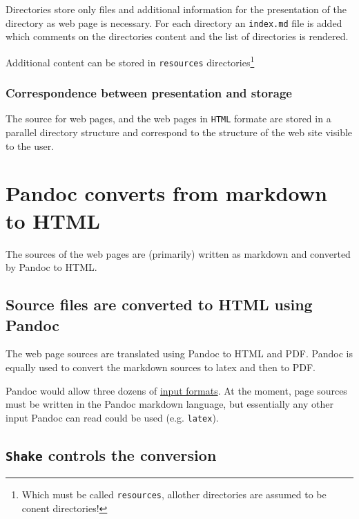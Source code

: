 \documentclass{tufte-book}
\begin{document}
Directories store only files and additional information for the
presentation of the directory as web page is necessary. For each
directory an \texttt{index.md} file is added which comments on the
directories content and the list of directories is rendered.

Additional content can be stored in \texttt{resources}
directories\footnote{Which must be called \texttt{resources}, allother
	directories are assumed to be conent directories!}

\hypertarget{correspondence-between-presentation-and-storage}{%
	\subsection{Correspondence between presentation and
		storage}\label{correspondence-between-presentation-and-storage}}

The source for web pages, and the web pages in \texttt{HTML} formate are
stored in a parallel directory structure and correspond to the structure
of the web site visible to the user.

\chapter{Pandoc converts from markdown to HTML}
\begin{mdframed}The sources of the web pages are (primarily) written as markdown and converted by Pandoc to HTML.\end{mdframed}
\hypertarget{source-files-are-converted-to-html-using-pandoc}{%
	\section{Source files are converted to HTML using
		Pandoc}\label{source-files-are-converted-to-html-using-pandoc}}

The web page sources are translated using Pandoc to HTML and PDF. Pandoc
is equally used to convert the markdown sources to latex and then to
PDF.

Pandoc would allow three dozens of
\href{https://pandoc.org/MANUAL.html}{input formats}. At the moment,
page sources must be written in the Pandoc markdown language, but
essentially any other input Pandoc can read could be used (e.g.
\texttt{latex}).

\hypertarget{shake-controls-the-conversion}{%
	\section{\texorpdfstring{\texttt{Shake} controls the
			conversion}{Shake controls the conversion}}\label{shake-controls-the-conversion}}
\end{document}
